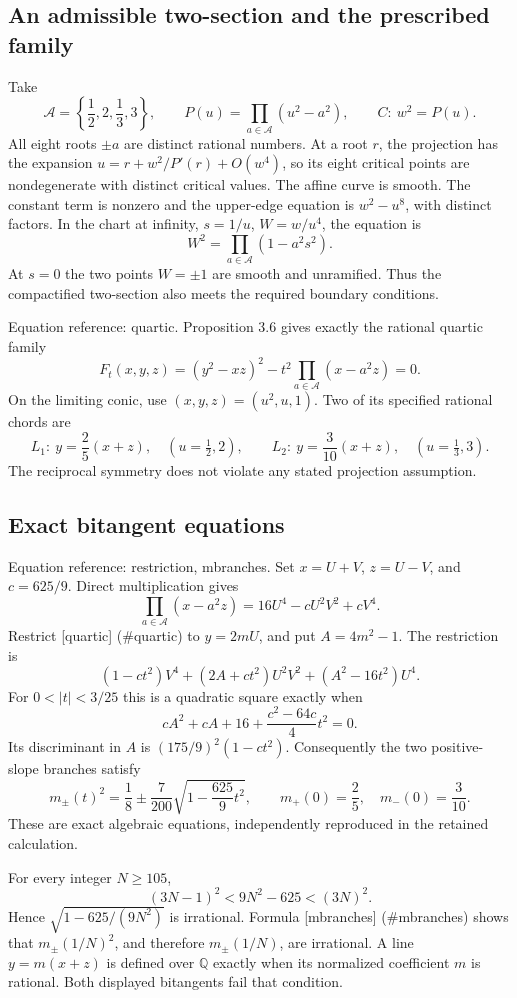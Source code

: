 \documentclass[10pt]{article}
\begin{document}
\subsection*{An admissible two-section and the prescribed family}
Take \[\mathcal A=\left\{\frac12,2,\frac13,3\right\},\qquad
 P(u)=\prod_{a\in\mathcal A}(u^2-a^2),\qquad C:\ w^2=P(u).\] All eight roots \(\pm a\) are distinct rational numbers. At a root \(r\), the projection has the expansion \(u=r+w^2/P'(r)+O(w^4)\), so its eight critical points are nondegenerate with distinct critical values. The affine curve is smooth. The constant term is nonzero and the upper-edge equation is \(w^2-u^8\), with distinct factors. In the chart at infinity, \(s=1/u\), \(W=w/u^4\), the equation is \[W^2=\prod_{a\in\mathcal A}(1-a^2s^2).\] At \(s=0\) the two points \(W=\pm1\) are smooth and unramified. Thus the compactified two-section also meets the required boundary conditions.\par
Equation reference: quartic. Proposition 3.6 gives exactly the rational quartic family \[F_t(x,y,z)=(y^2-xz)^2-t^2\prod_{a\in\mathcal A}(x-a^2z)=0.
 \] On the limiting conic, use \((x,y,z)=(u^2,u,1)\). Two of its specified rational chords are \[L_1:\ y=\frac25(x+z),\quad (u=\tfrac12,2),
 \qquad
 L_2:\ y=\frac3{10}(x+z),\quad (u=\tfrac13,3).\] The reciprocal symmetry does not violate any stated projection assumption.\par
\subsection*{Exact bitangent equations}
Equation reference: restriction, mbranches. Set \(x=U+V\), \(z=U-V\), and \(c=625/9\). Direct multiplication gives \[\prod_{a\in\mathcal A}(x-a^2z)
 =16U^4-cU^2V^2+cV^4.\] Restrict [quartic] (\#quartic) to \(y=2mU\), and put \(A=4m^2-1\). The restriction is \[(1-ct^2)V^4+(2A+ct^2)U^2V^2+(A^2-16t^2)U^4.
 \] For \(0<|t|<3/25\) this is a quadratic square exactly when \[cA^2+cA+16+\frac{c^2-64c}{4}t^2=0.\] Its discriminant in \(A\) is \((175/9)^2(1-ct^2)\). Consequently the two positive-slope branches satisfy \[m_\pm(t)^2=\frac18\pm\frac7{200}
                 \sqrt{1-\frac{625}{9}t^2},
 \qquad
 m_+(0)=\frac25,\quad m_-(0)=\frac3{10}.
 \] These are exact algebraic equations, independently reproduced in the retained calculation.\par
For every integer \(N\ge105\), \[(3N-1)^2<9N^2-625<(3N)^2.\] Hence \(\sqrt{1-625/(9N^2)}\) is irrational. Formula [mbranches] (\#mbranches) shows that \(m_\pm(1/N)^2\), and therefore \(m_\pm(1/N)\), are irrational. A line \(y=m(x+z)\) is defined over \(\mathbb Q\) exactly when its normalized coefficient \(m\) is rational. Both displayed bitangents fail that condition.\par
\end{document}
